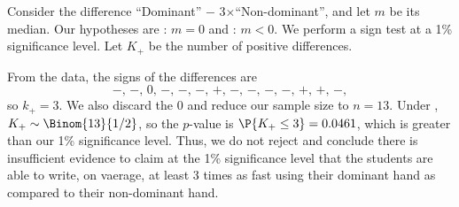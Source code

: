 \begin{solution}
    Consider the difference ``Dominant'' $-$ 3$\times$``Non-dominant'', and let $m$ be its median. Our hypotheses are \nullhyp: $m = 0$ and \althyp: $m < 0$. We perform a sign test at a 1\% significance level. Let $K_+$ be the number of positive differences.

    From the data, the signs of the differences are \[-, \, -, \, 0, \, -, \, -, \, -, \, +, \, -, \, -, \, -, \, -, \, +, \, +, \, -,\] so $k_+ = 3$. We also discard the 0 and reduce our sample size to $n = 13$. Under \nullhyp, $K_+ \sim \Binom{13}{1/2}$, so the $p$-value is $\P{K_+ \leq 3} = 0.0461$, which is greater than our 1\% significance level. Thus, we do not reject \nullhyp{} and conclude there is insufficient evidence to claim at the 1\% significance level that the students are able to write, on vaerage, at least 3 times as fast using their dominant hand as compared to their non-dominant hand.
\end{solution}
